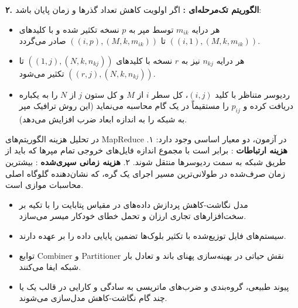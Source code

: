 \textbf{۲. الگوریتم تک‌مرحله‌ای :}
اگر اولویت کاهش تعداد گذرها و زمان پایان باشد:
\begin{itemize}
    \item هر درایه $m_{ik}$ توسط مپر به $p$ نسخه تکثیر شده و با کلیدهای $((i, 1), (M, k, m_{ik}))$ تا $((i, p), (M, k, m_{ik}))$ صادر می‌گردد.
    \item هر درایه $n_{kj}$ نیز به $r$ نسخه با کلیدهای $((1, j), (N, k, n_{kj}))$ تا $((r, j), (N, k, n_{kj}))$ تکثیر می‌شود.
    \item ردیوسر متناظر با کلید $(i, j)$، کل سطر $i$ از $M$ و کل ستون $j$ از $N$ را به یکباره دریافت کرده و $p_{ij}$ را مستقیماً در یک گام محاسبه می‌نماید (این روش ترافیک مپر به شبکه را به اندازه ابعاد ضرب افزایش می‌دهد).
\end{itemize}

\begin{examnote}
در تحلیل هزینه الگوریتم‌های MapReduce در آزمون، دو معیار اساسی وجود دارد:
۱. \textbf{هزینه ارتباطات }: برابر است با مجموع اندازه فایل‌های خروجی تمام مپرها که باید از طریق شبکه به سمت ردیوسرها منتقل شوند.
۲. \textbf{هزینه زمانی سپری‌شده }: بیشترین زمان صرف‌شده در طولانی‌ترین مسیر اجرای یک گره، که نشان‌دهنده گلوگاه اصلی محاسبات موازی است.
\end{examnote}

\begin{summarybox}
\begin{itemize}
    \item مدل نگاشت-کاهش پردازش داده‌های در مقیاس پتابایت را با تکیه بر سخت‌افزارهای تجاری ارزان و تحمل خطای خودکار میسر می‌سازد.
    \item سیستم‌های فایل توزیع‌شده  با تکثیر بلوک‌ها تضمین پایایی داده را بر عهده دارند.
    \item توابع Combiner و Partitioner نقش حیاتی در بهینه‌سازی پهنای باند و تعادل بار شبکه ایفا می‌کنند.
    \item پیوند طبیعی، گروه‌بندی و ضرب‌های ماتریسی به سادگی و کارایی در قالب یک یا چند گام نگاشت-کاهش مدل‌سازی می‌شوند.
\end{itemize}
\end{summarybox}
